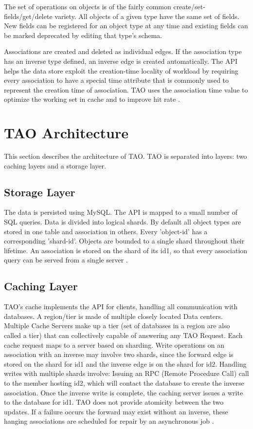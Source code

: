 \documentclass[9pt,twocolumn,twoside]{../../styles/osajnl}
\begin{document}
The set of operations on objects is of the fairly common create/set-fields/get/delete variety. All objects of a given type have the same set of fields. New fields can be registered for an object type at any time and existing fields can be marked deprecated by editing that type’s schema. 

Associations are created and deleted as individual edges. If the association type has an inverse type defined, an inverse edge is created automatically. The API helps the data store exploit the creation-time locality of workload by requiring every association to have a special time attribute that is commonly used to represent the creation time of association. TAO uses the association time value to optimize the working set in cache and to improve hit rate \cite{book-tao1}.

\section{TAO Architecture}

This section describes the architecture of TAO. TAO is separated into layers: two caching layers and a storage layer.
\subsection{Storage Layer}

The data is persisted using MySQL. The API is mapped to a small number of SQL queries. Data is divided into logical shards. By default all object types are stored in one table and association in others. Every 'object-id' has a corresponding 'shard-id'. Objects are bounded to a single shard throughout their lifetime. An association is stored on the shard of its id1, so that every association query can be served from a single server \cite{www-tao4}.

\subsection{Caching Layer}
TAO’s cache implements the API for clients, handling all communication with databases. A region/tier is made of multiple closely located Data centers. Multiple Cache Servers make up a tier (set of databases in a region are also called a tier) that can collectively capable of answering any TAO Request. Each cache request maps to a server based on sharding. Write operations on an association with an inverse may involve two shards, since the forward edge is stored on the shard for id1 and the inverse edge is on the shard for id2. Handling writes with multiple shards involve: Issuing an RPC (Remote Procedure Call) call to the member hosting id2, which will contact the database to create the inverse association. Once the inverse write is complete, the caching server issues a write to the database for id1. TAO does not provide atomicity between the two updates. If a failure occurs the forward may exist without an inverse, these hanging associations are scheduled for repair by an asynchronous job \cite{www-tao4}.
\end{document}
